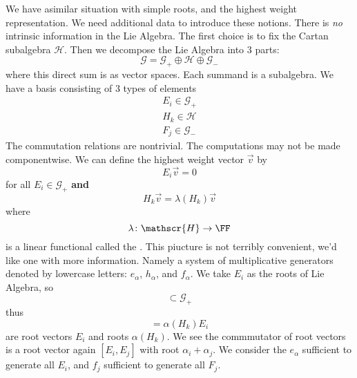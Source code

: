 We have asimilar situation with simple roots, and the highest
weight representation. We need additional data to introduce
these notions. There is \emph{no} intrinsic information in the
Lie Algebra. The first choice is to fix the Cartan subalgebra
$\mathscr{H}$. Then we decompose the Lie Algebra into 3 parts:
\begin{equation}
\mathscr{G}=\mathscr{G}_{+}\oplus\mathscr{H}\oplus\mathscr{G}_{-}
\end{equation}
where this direct sum is as vector spaces. Each summand is a
subalgebra. We have a basis consisting of 3 types of elements
\begin{subequations}
\begin{align}
E_{i}\in\mathscr{G}_{+}\\
H_{k}\in\mathscr{H}\\
F_{j}\in\mathscr{G}_{-}
\end{align}
\end{subequations}
The commutation relations are nontrivial. The computations may
not be made componentwise. We can define the highest weight
vector $\vec{v}$ by
\begin{equation}
E_{i}\vec{v}=0
\end{equation}
for all $E_{i}\in\mathscr{G}_{+}$ \textbf{and}
\begin{equation}
H_{k}\vec{v}=\lambda(H_{k})\vec{v}
\end{equation}
where
\begin{equation}
\lambda\colon\mathscr{H}\to\FF
\end{equation}
is a linear functional called the . This
piucture is not terribly convenient, we'd like one with more
information. Namely a system of multiplicative generators denoted
by lowercase letters: $e_{\alpha}$, $h_{\alpha}$, and
$f_{\alpha}$. We take $E_{i}$ as the roots of Lie Algebra, so
\begin{equation}
[H,\mathscr{G}_{+}]\subset\mathscr{G}_{+}
\end{equation}
thus
\begin{equation}
[H_{k},E_{i}] = \alpha(H_{k})E_{i}
\end{equation}
are root vectors $E_{i}$ and roots $\alpha(H_{k})$. We see the
commmutator of root vectors is a root vector again
$[E_{i},E_{j}]$ with root $\alpha_{i}+\alpha_{j}$. We consider
the $e_{\alpha}$ sufficient to generate all $E_{i}$, and $f_{j}$
sufficient to generate all $F_{j}$.
